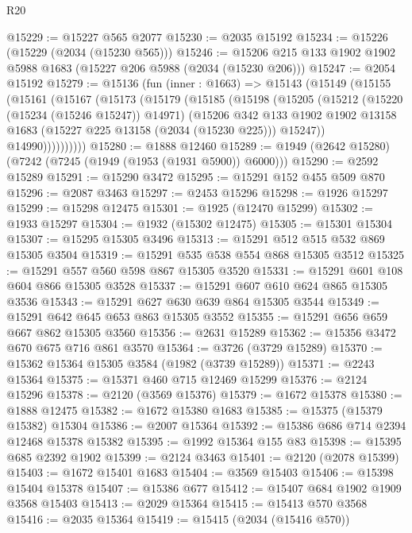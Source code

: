 \begin{lexlean}{R20}
\begin{coremodule}
@15229 := @15227 @565 @2077
@15230 := @2035 @15192
@15234 := @15226 (@15229 (@2034 (@15230 @565)))
@15246 := @15206 @215 @133 @1902 @1902 @5988 @1683 (@15227 @206 @5988 (@2034 (@15230 @206)))
@15247 := @2054 @15192
@15279 := @15136
    (fun (inner : @1663) =>
    @15143
      (@15149
        (@15155
          (@15161
            (@15167
              (@15173
                (@15179
                  (@15185
                    (@15198
                      (@15205
                        (@15212
                          (@15220 (@15234 (@15246 @15247)) @14971)
                          (@15206
                            @342
                            @133
                            @1902
                            @1902
                            @13158
                            @1683
                            (@15227 @225 @13158 (@2034 (@15230 @225)))
                            @15247))
                        @14990))))))))))
@15280 := @1888 @12460
@15289 := @1949 (@2642 @15280) (@7242 (@7245 (@1949 (@1953 (@1931 @5900)) @6000)))
@15290 := @2592 @15289
@15291 := @15290 @3472
@15295 := @15291 @152 @455 @509 @870
@15296 := @2087 @3463
@15297 := @2453 @15296
@15298 := @1926 @15297
@15299 := @15298 @12475
@15301 := @1925 (@12470 @15299)
@15302 := @1933 @15297
@15304 := @1932 (@15302 @12475)
@15305 := @15301 @15304
@15307 := @15295 @15305 @3496
@15313 := @15291 @512 @515 @532 @869 @15305 @3504
@15319 := @15291 @535 @538 @554 @868 @15305 @3512
@15325 := @15291 @557 @560 @598 @867 @15305 @3520
@15331 := @15291 @601 @108 @604 @866 @15305 @3528
@15337 := @15291 @607 @610 @624 @865 @15305 @3536
@15343 := @15291 @627 @630 @639 @864 @15305 @3544
@15349 := @15291 @642 @645 @653 @863 @15305 @3552
@15355 := @15291 @656 @659 @667 @862 @15305 @3560
@15356 := @2631 @15289
@15362 := @15356 @3472 @670 @675 @716 @861 @3570
@15364 := @3726 (@3729 @15289)
@15370 := @15362 @15364 @15305 @3584 (@1982 (@3739 @15289))
@15371 := @2243 @15364
@15375 := @15371 @460 @715 @12469 @15299
@15376 := @2124 @15296
@15378 := @2120 (@3569 @15376)
@15379 := @1672 @15378
@15380 := @1888 @12475
@15382 := @1672 @15380 @1683
@15385 := @15375 (@15379 @15382) @15304
@15386 := @2007 @15364
@15392 := @15386 @686 @714 @2394 @12468 @15378 @15382
@15395 := @1992 @15364 @155 @83
@15398 := @15395 @685 @2392 @1902
@15399 := @2124 @3463
@15401 := @2120 (@2078 @15399)
@15403 := @1672 @15401 @1683
@15404 := @3569 @15403
@15406 := @15398 @15404 @15378
@15407 := @15386 @677
@15412 := @15407 @684 @1902 @1909 @3568 @15403
@15413 := @2029 @15364
@15415 := @15413 @570 @3568
@15416 := @2035 @15364
@15419 := @15415 (@2034 (@15416 @570))

\end{coremodule}
\end{lexlean}
